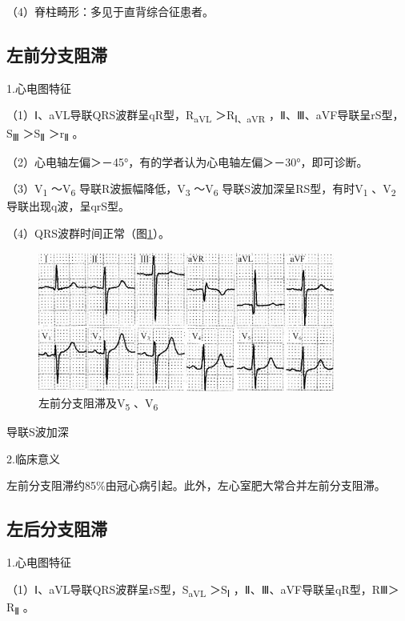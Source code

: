 （4）脊柱畸形：多见于直背综合征患者。

\protect\hypertarget{text00009.htmlux5cux23subid52}{}{}

\subsection{左前分支阻滞}

1.心电图特征

（1）Ⅰ、aVL导联QRS波群呈qR型，R\textsubscript{aVL}
＞R\textsubscript{Ⅰ、aVR} ，Ⅱ、Ⅲ、aVF导联呈rS型，S\textsubscript{Ⅲ}
＞S\textsubscript{Ⅱ} ＞r\textsubscript{Ⅱ} 。

（2）心电轴左偏＞－45°，有的学者认为心电轴左偏＞－30°，即可诊断。

（3）V\textsubscript{1} ～V\textsubscript{6}
导联R波振幅降低，V\textsubscript{3} ～V\textsubscript{6}
导联S波加深呈RS型，有时V\textsubscript{1} 、V\textsubscript{2}
导联出现q波，呈qrS型。

（4）QRS波群时间正常（图\ref{fig3-11}）。

\begin{figure}[!htbp]
 \centering
 \includegraphics[width=3.84375in,height=1.8125in]{./images/Image00061.jpg}
 \captionsetup{justification=centering}
 \caption{左前分支阻滞及V\textsubscript{5} 、V\textsubscript{6}}
 \label{fig3-11}
  \end{figure} 
导联S波加深

2.临床意义

左前分支阻滞约85\%由冠心病引起。此外，左心室肥大常合并左前分支阻滞。

\protect\hypertarget{text00009.htmlux5cux23subid53}{}{}

\subsection{左后分支阻滞}

1.心电图特征

（1）Ⅰ、aVL导联QRS波群呈rS型，S\textsubscript{aVL} ＞S\textsubscript{Ⅰ}
，Ⅱ、Ⅲ、aVF导联呈qR型，RⅢ＞R\textsubscript{Ⅱ} 。


